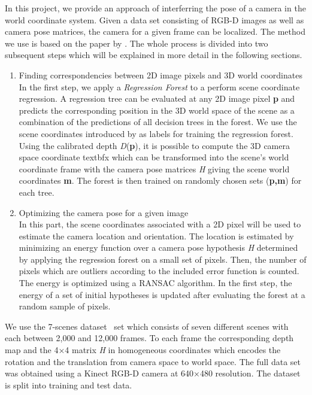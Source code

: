 \documentclass[final]{cvpr}
\begin{document}
In this project, we provide an approach of interferring the pose of a camera in the world coordinate system. 
Given a data set consisting of RGB-D images as well as camera pose matrices, the camera for a given frame can 
be localized. The method we use is based on the paper by \cite{shotton2013}.  The whole process is divided into 
two subsequent steps which will be explained in more detail in the following sections.
\begin{enumerate}
\item Finding correspondencies between 2D image pixels and 3D world coordinates  \\

In the first step, we apply a \textit{Regression Forest} to a perform scene coordinate regression. 
A regression tree can be evaluated at any 2D image pixel \textbf{p} and predicts the corresponding position 
in the 3D world space of the scene as a combination of the predictions of all decision trees in the forest. 
We use the scene coordinates introduced by \cite{shotton2013} as labels for training the regression forest. 
Using the calibrated depth \textit{D}(\textbf{p}), it is possible to compute the 3D camera space coordinate 
textbf{x} which can be transformed into the scene's world coordinate frame with the camera pose matrices \textit{H}
 giving  the scene world coordinates \textbf{m}. The forest is then trained on randomly chosen sets (\textbf{p,m})
  for each tree.

\item Optimizing the camera pose for a given image \\
In this part, the scene coordinates associated with a 2D pixel will be used to estimate the camera location and
 orientation. The location is estimated by minimizing an energy function over a camera pose hypothesis \textit{H} 
 determined by applying the regression forest on a small set of pixels. Then, the number of pixels which are 
 outliers according to the included error function is counted. The energy is optimized using a RANSAC algorithm.
  In the first step, the energy of a set of initial hypotheses is updated after evaluating the forest at a random 
  sample of pixels.
\end{enumerate}
    
    


We use the 7-scenes dataset~\cite{glocker2013} set which consists of seven different scenes with each between 2,000 and 12,000 frames. To each frame the corresponding depth map and the 4×4 matrix \textit{H} in homogeneous coordinates which encodes the rotation and the translation from camera space to world space. The full data set was obtained using a Kinect RGB-D camera at 640×480 resolution. The dataset is split into training and test data.
\end{document}
